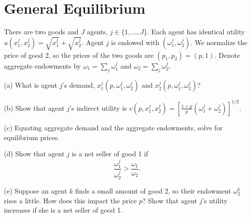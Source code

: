 \section{General Equilibrium}

There are two goods and \( J \) agents, \( j \in \{1, \ldots, J\} \). Each agent has identical utility \( u(x^j_1, x^j_2) = \sqrt{x^j_1} + \sqrt{x^j_2} \). Agent \( j \) is endowed with \( (\omega^j_1, \omega^j_2) \). We normalize the price of good 2, so the prices of the two goods are \( (p_1, p_2) = (p, 1) \). Denote aggregate endowments by \( \omega_1 = \sum_j \omega^j_1 \) and \( \omega_2 = \sum_j \omega^j_2 \).


\begin{tcolorbox}
    (a) What is agent \( j \)'s demand, \( x^j_1(p, \omega^j_1, \omega^j_2) \) and \( x^j_2(p, \omega^j_1, \omega^j_2) \)?
\end{tcolorbox}
\begin{tcolorbox}
    (b) Show that agent \( j \)'s indirect utility is \( v(p, x^j_1, x^j_2) = \left[ \frac{1+p}{p} (\omega^j_1 + \omega^j_2) \right]^{1/2} \).
\end{tcolorbox}
\begin{tcolorbox}
    (c) Equating aggregate demand and the aggregate endowments, solve for equilibrium prices.
\end{tcolorbox}
\begin{tcolorbox}
    (d) Show that agent \( j \) is a net seller of good 1 if
    \[
    \frac{\omega^j_1}{\omega^j_2} > \frac{\omega_1}{\omega_2}.
    \]
\end{tcolorbox}
\begin{tcolorbox}
        (e) Suppose an agent \( k \) finds a small amount of good 2, so their endowment \( \omega^k_2 \) rises a little. How does this impact the price \( p \)? Show that agent \( j \)'s utility increases if she is a net seller of good 1.
\end{tcolorbox}
